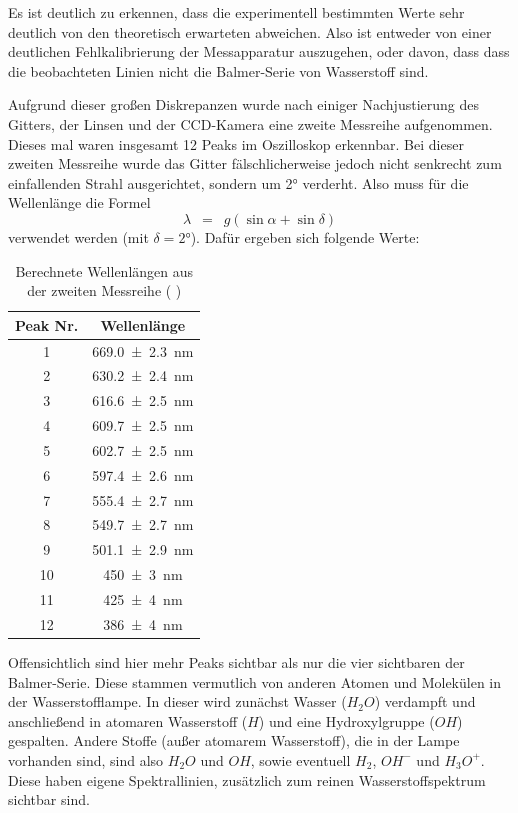 \documentclass{article}
\newcommand{\widespace}{\enspace}
\newcommand{\wideeq}{\widespace = \widespace}
\newcommand{\coderef}[1]{%
    \text{\footnotesize \colorbox{codebg}{\texttt{#1()}}}%
}
\begin{document}
Es ist deutlich zu erkennen, dass die experimentell bestimmten Werte
sehr deutlich von den theoretisch erwarteten abweichen.
Also ist entweder von einer deutlichen Fehlkalibrierung der Messapparatur
auszugehen, oder davon, dass dass die beobachteten Linien nicht die Balmer-Serie
von Wasserstoff sind.

Aufgrund dieser großen Diskrepanzen wurde nach einiger Nachjustierung des Gitters,
der Linsen und der CCD-Kamera eine zweite Messreihe aufgenommen. Dieses mal
waren insgesamt 12 Peaks im Oszilloskop erkennbar.
Bei dieser zweiten Messreihe wurde das Gitter fälschlicherweise jedoch nicht
senkrecht zum einfallenden Strahl ausgerichtet, sondern um \ang{2} verderht.
Also muss für die Wellenlänge die Formel
\[
    \lambda \wideeq g (\sin \alpha + \sin \delta)
\]
verwendet werden (mit $\delta = \ang{2}$).
Dafür ergeben sich folgende Werte:

\begin{table}[H]
    \centering
    \begin{tabular}{c|c}
        Peak Nr. & Wellenlänge \\
        \hline
        1 & \qty{669.0 \pm   2.3}{\nm} \\
        2 & \qty{630.2 \pm  2.4}{\nm} \\
        3 & \qty{616.6 \pm  2.5}{\nm} \\
        4 & \qty{609.7 \pm  2.5}{\nm} \\
        5 & \qty{602.7 \pm  2.5}{\nm} \\
        6 & \qty{597.4 \pm  2.6}{\nm} \\
        7 & \qty{555.4 \pm  2.7}{\nm} \\
        8 & \qty{549.7 \pm  2.7}{\nm} \\
        9 & \qty{501.1 \pm  2.9}{\nm} \\
        10 & \qty{450 \pm  3}{\nm} \\
        11 & \qty{425 \pm  4}{\nm} \\
        12 & \qty{386 \pm  4}{\nm}
    \end{tabular}
    \caption{Berechnete Wellenlängen aus der zweiten Messreihe (\coderef{tv1})}
    \label{TV1_Messreihe2}
\end{table}

Offensichtlich sind hier mehr Peaks sichtbar als nur die vier sichtbaren der
Balmer-Serie. Diese stammen vermutlich von anderen Atomen und Molekülen in
der Wasserstofflampe. In dieser wird zunächst Wasser ($H_2O$) verdampft
und anschließend in atomaren Wasserstoff ($H$) und eine Hydroxylgruppe ($OH$)
gespalten. Andere Stoffe (außer atomarem Wasserstoff), die in der Lampe
vorhanden sind, sind also $H_2O$ und $OH$, sowie eventuell $H_2$, $OH^-$
und $H_3O^+$. Diese haben eigene Spektrallinien, zusätzlich zum reinen
Wasserstoffspektrum sichtbar sind.
\end{document}
